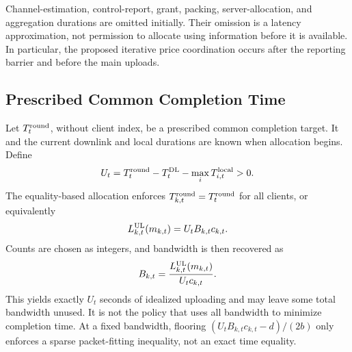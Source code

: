 Channel-estimation, control-report, grant, packing, server-allocation, and aggregation durations are omitted initially. Their omission is a latency approximation, not permission to allocate using information before it is available. In particular, the proposed iterative price coordination occurs after the reporting barrier and before the main uploads.

\subsection{Prescribed Common Completion Time}
Let $T_t^{\mathrm{round}}$, without client index, be a prescribed common completion target. It and the current downlink and local durations are known when allocation begins. Define
\begin{equation}
 U_t=T_t^{\mathrm{round}}-T_t^{\mathrm{DL}}-\max_iT_{i,t}^{\mathrm{local}}>0.
 \label{eq:uplink-budget}
\end{equation}
The equality-based allocation enforces $T_{k,t}^{\mathrm{round}}=T_t^{\mathrm{round}}$ for all clients, or equivalently
\begin{equation}
 L_{k,t}^{\mathrm{UL}}(m_{k,t})=U_tB_{k,t}c_{k,t}.
 \label{eq:time-equality}
\end{equation}
Counts are chosen as integers, and bandwidth is then recovered as
\begin{equation}
 B_{k,t}=\frac{L_{k,t}^{\mathrm{UL}}(m_{k,t})}{U_tc_{k,t}}.
 \label{eq:bandwidth-recovery}
\end{equation}
This yields exactly $U_t$ seconds of idealized uploading and may leave some total bandwidth unused. It is not the policy that uses all bandwidth to minimize completion time. At a fixed bandwidth, flooring $(U_tB_{k,t}c_{k,t}-d)/(2b)$ only enforces a sparse packet-fitting inequality, not an exact time equality.
